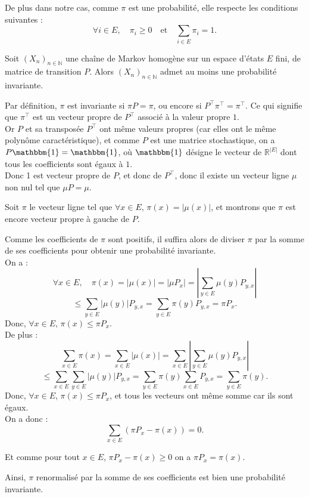 \documentclass{article}
\begin{document}
De plus dans notre cas, comme $\pi$ est une probabilité, elle respecte les conditions suivantes :
\[
\forall i \in E, \quad \pi_i \geq 0 \quad \text{et} \quad \sum_{i \in E} \pi_i = 1.
\]

\begin{tcolorbox}[colback=white,colframe=blue!80!black,title=Existence d'une probabilité invariante]
Soit $(X_n)_{n \in \mathbb{N}}$ une chaîne de Markov homogène sur un espace d'états $E$ fini, de matrice de transition $P$. Alors $(X_n)_{n \in \mathbb{N}}$ admet au moins une probabilité invariante.
\end{tcolorbox}

\begin{tcolorbox}[colback=white,colframe=green!80!black,title=Démonstration, breakable]

Par définition, $\pi$ est invariante si $\pi P = \pi$, ou encore si $P^{\top} \pi^{\top} = \pi^{\top}$. Ce qui signifie que $\pi^{\top}$ est un vecteur propre de $P^{\top}$ associé à la valeur propre $1$. \\

Or $P$ et sa transposée $P^{\top}$ ont même valeurs propres (car elles ont le même polynôme caractéristique), et comme $P$ est une matrice stochastique, on a $P \mathbbm{1} = \mathbbm{1}$, où $\mathbbm{1}$ désigne le vecteur de $\mathbb{R}^{|E|}$ dont tous les coefficients sont égaux à $1$. \\

Donc 1 est vecteur propre de $P$, et donc de $P^{\top}$, donc il existe un vecteur ligne $\mu$ non nul tel que $\mu P = \mu$.

Soit $\pi$ le vecteur ligne tel que $\forall x \in E$, $\pi(x) = |\mu(x)|$, et montrons que $\pi$ est encore vecteur propre à gauche de $P$.

Comme les coefficients de $\pi$ sont positifs, il suffira alors de diviser $\pi$ par la somme de ses coefficients pour obtenir une probabilité invariante. \\

On a :
\[
\forall x \in E, \quad \pi(x) = |\mu(x)| = |\mu P_x| = \left| \sum_{y \in E} \mu(y) P_{y,x} \right|
\]
\[
\leq \sum_{y \in E} |\mu(y)| P_{y,x} = \sum_{y \in E} \pi(y) P_{y,x} = \pi P_x.
\]
Donc, $\forall x \in E$, $\pi(x) \leq \pi P_x$. \\

De plus :
\[
\sum_{x \in E} \pi(x) = \sum_{x \in E} |\mu(x)| = \sum_{x \in E} \left| \sum_{y \in E} \mu(y) P_{y,x} \right|
\]
\[
\leq \sum_{x \in E} \sum_{y \in E} |\mu(y)| P_{y,x} = \sum_{y \in E} \pi(y) \sum_{x \in E} P_{y,x} = \sum_{y \in E} \pi(y).
\]
Donc, $\forall x \in E$, $\pi(x) \leq \pi P_x$, et tous les vecteurs ont même somme car ils sont égaux. \\

On a donc :
\[
\sum_{x \in E} (\pi P_x - \pi(x)) = 0.
\]

Et comme pour tout $x \in E$, $\pi P_x - \pi(x) \geq 0$ on a $\pi P_x = \pi(x)$.

Ainsi, $\pi$ renormalisé par la somme de ses coefficients est bien une probabilité invariante.
\end{tcolorbox}
\end{document}
